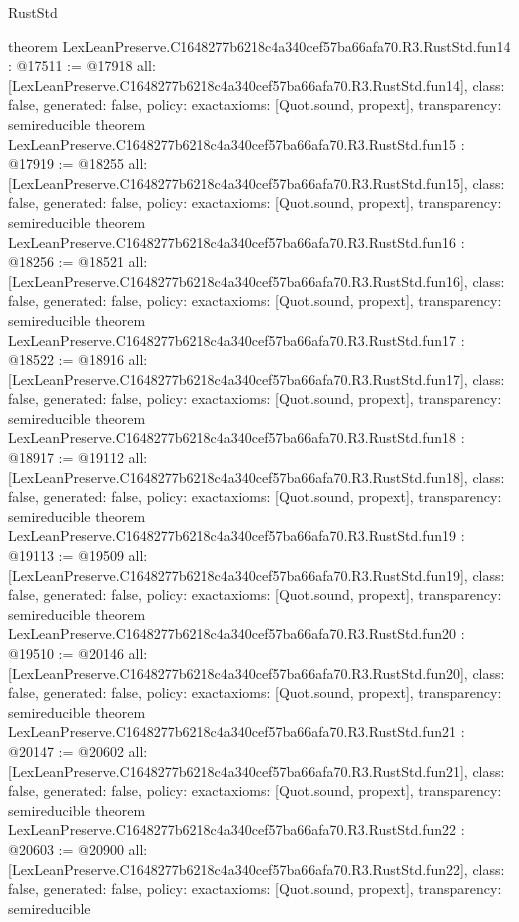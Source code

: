 \begin{lexlean}{RustStd}
\begin{coremodule}
{}
theorem LexLeanPreserve.C1648277b6218c4a340cef57ba66afa70.R3.RustStd.fun14 : @17511 := @17918 {
  all: [LexLeanPreserve.C1648277b6218c4a340cef57ba66afa70.R3.RustStd.fun14],
  class: false,
  generated: false,
  policy: exact{axioms: [Quot.sound, propext]},
  transparency: semireducible
}
theorem LexLeanPreserve.C1648277b6218c4a340cef57ba66afa70.R3.RustStd.fun15 : @17919 := @18255 {
  all: [LexLeanPreserve.C1648277b6218c4a340cef57ba66afa70.R3.RustStd.fun15],
  class: false,
  generated: false,
  policy: exact{axioms: [Quot.sound, propext]},
  transparency: semireducible
}
theorem LexLeanPreserve.C1648277b6218c4a340cef57ba66afa70.R3.RustStd.fun16 : @18256 := @18521 {
  all: [LexLeanPreserve.C1648277b6218c4a340cef57ba66afa70.R3.RustStd.fun16],
  class: false,
  generated: false,
  policy: exact{axioms: [Quot.sound, propext]},
  transparency: semireducible
}
theorem LexLeanPreserve.C1648277b6218c4a340cef57ba66afa70.R3.RustStd.fun17 : @18522 := @18916 {
  all: [LexLeanPreserve.C1648277b6218c4a340cef57ba66afa70.R3.RustStd.fun17],
  class: false,
  generated: false,
  policy: exact{axioms: [Quot.sound, propext]},
  transparency: semireducible
}
theorem LexLeanPreserve.C1648277b6218c4a340cef57ba66afa70.R3.RustStd.fun18 : @18917 := @19112 {
  all: [LexLeanPreserve.C1648277b6218c4a340cef57ba66afa70.R3.RustStd.fun18],
  class: false,
  generated: false,
  policy: exact{axioms: [Quot.sound, propext]},
  transparency: semireducible
}
theorem LexLeanPreserve.C1648277b6218c4a340cef57ba66afa70.R3.RustStd.fun19 : @19113 := @19509 {
  all: [LexLeanPreserve.C1648277b6218c4a340cef57ba66afa70.R3.RustStd.fun19],
  class: false,
  generated: false,
  policy: exact{axioms: [Quot.sound, propext]},
  transparency: semireducible
}
theorem LexLeanPreserve.C1648277b6218c4a340cef57ba66afa70.R3.RustStd.fun20 : @19510 := @20146 {
  all: [LexLeanPreserve.C1648277b6218c4a340cef57ba66afa70.R3.RustStd.fun20],
  class: false,
  generated: false,
  policy: exact{axioms: [Quot.sound, propext]},
  transparency: semireducible
}
theorem LexLeanPreserve.C1648277b6218c4a340cef57ba66afa70.R3.RustStd.fun21 : @20147 := @20602 {
  all: [LexLeanPreserve.C1648277b6218c4a340cef57ba66afa70.R3.RustStd.fun21],
  class: false,
  generated: false,
  policy: exact{axioms: [Quot.sound, propext]},
  transparency: semireducible
}
theorem LexLeanPreserve.C1648277b6218c4a340cef57ba66afa70.R3.RustStd.fun22 : @20603 := @20900 {
  all: [LexLeanPreserve.C1648277b6218c4a340cef57ba66afa70.R3.RustStd.fun22],
  class: false,
  generated: false,
  policy: exact{axioms: [Quot.sound, propext]},
  transparency: semireducible
}
\end{coremodule}
\end{lexlean}
